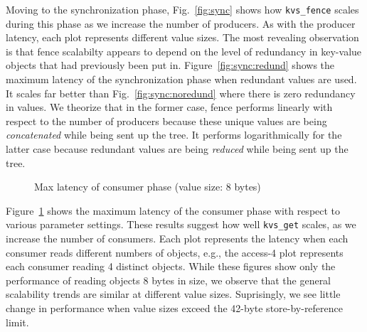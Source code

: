 Moving to the synchronization phase, Fig.~\ref{fig:sync} shows 
how {\tt kvs\_fence} scales during this phase
as we increase the number of producers. 
As with the producer latency,
each plot represents different value sizes.
The most revealing observation is that
fence scalabilty appears to depend on the level of
redundancy in key-value objects that had previously 
been put in. Figure~\ref{fig:sync:redund} 
shows the maximum latency of the synchronization phase
when redundant values are used. It scales
far better than Fig.~\ref{fig:sync:noredund}
where there is zero redundancy in values. 
We theorize that in the former case, fence performs linearly with respect to the number of
producers because these unique values are being {\em concatenated} while
being sent up the tree. It performs logarithmically for the latter case
because redundant values are being {\em reduced} while being sent 
up the tree. %



\begin{figure}[ht]
\centering
\begin{subfigure}[With single-directory layout]{
  \texttt{[image: consumer-1-dir]}
  \label{fig:cons:dir}
}%
\end{subfigure}
\begin{subfigure}[Improvements with multiple directories]{
  \texttt{[image: consumer-dist-dir]}
  \label{fig:cons:dirs}
}%
\end{subfigure}
\caption{Max latency of consumer phase (value size: 8 bytes)}
\vspace{-.5cm}
\label{fig:consumer}
\end{figure}

Figure~\ref{fig:consumer} shows the maximum latency of the consumer
phase with respect to various parameter settings. 
These results suggest how well {\tt kvs\_get}
scales, as we increase the number of consumers. Each plot represents
the latency when each consumer reads different numbers of 
objects, e.g., the access-4 plot represents each consumer reading
4 distinct objects.  While these figures show only the performance of reading
objects 8 bytes in size, we observe that the general 
scalability trends are similar at different value sizes.
Suprisingly, we see little change in performance when value sizes
exceed the 42-byte store-by-reference limit.

